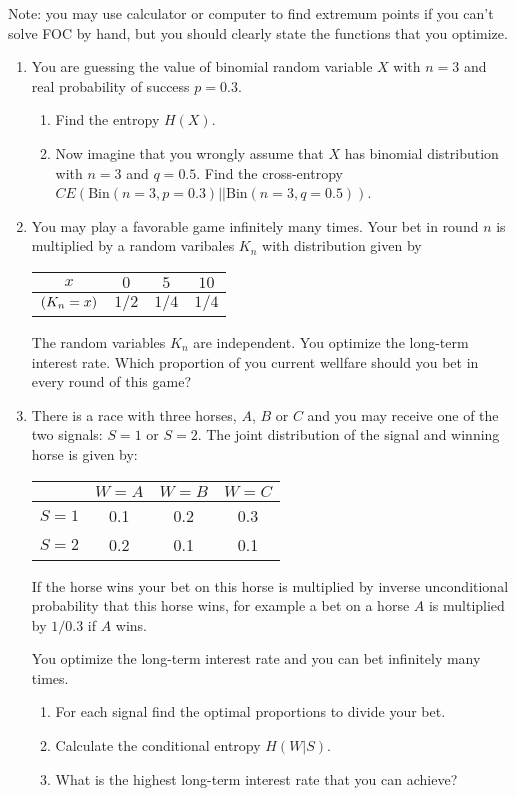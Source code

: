 \documentclass[12pt]{article}
\let\P\relax
\DeclareMathOperator{\P}{\mathbb{P}}
\newcommand{\dBin}{\mathrm{Bin}}
\begin{document}
Note: you may use calculator or computer to find extremum points if you can't solve FOC by hand, 
but you should clearly state the functions that you optimize.


\begin{enumerate}
\item You are guessing the value of binomial random variable $X$ with $n=3$ and real probability of success $p=0.3$.
\begin{enumerate}
    \item Find the entropy $H(X)$. 
    \item Now imagine that you wrongly assume that $X$ has binomial distribution with $n=3$ and $q=0.5$.
    Find the cross-entropy $CE(\dBin(n=3, p=0.3)||\dBin(n=3, q=0.5))$.
\end{enumerate}
\item You may play a favorable game infinitely many times. 
Your bet in round $n$ is multiplied by a random varibales $K_n$ with distribution given by 

\begin{tabular}{*{4}{c}}
    \toprule
    $x$ & $0$ & $5$ & $10$  \\
    \midrule
    $\P(K_n=x)$ & $1/2$ & $1/4$ & $1/4$ \\
    \bottomrule
\end{tabular}

The random variables $K_n$ are independent. 
You optimize the long-term interest rate. 
Which proportion of you current wellfare should you bet in every round of this game?

\item There is a race with three horses, $A$, $B$ or $C$ and you may receive one of the two signals: $S=1$ or $S=2$.
The joint distribution of the signal and winning horse is given by:

\begin{tabular}{*{4}{c}}
    \toprule
    & $W=A$ & $W=B$ & $W=C$ \\
    \midrule
    $S=1$ & 0.1 & 0.2 & 0.3  \\
    $S=2$ & 0.2 & 0.1 & 0.1  \\
    \bottomrule
\end{tabular}

If the horse wins your bet on this horse is multiplied by inverse unconditional  probability that this horse wins, 
for example a bet on a horse $A$ is multiplied by $1/0.3$ if $A$ wins. 

You optimize the long-term interest rate and you can bet infinitely many times. 

\begin{enumerate}
    \item For each signal find the optimal proportions to divide your bet.
    \item Calculate the conditional entropy $H(W|S)$.
    \item What is the highest long-term interest rate that you can achieve?
\end{enumerate}

\end{enumerate}
\end{document}
